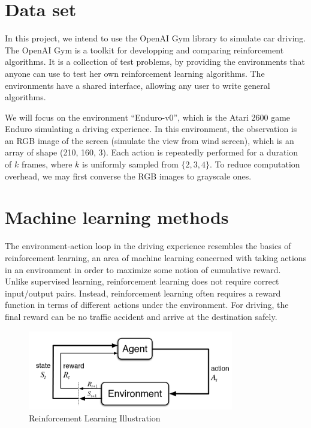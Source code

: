 \documentclass[a4paper]{article}
\begin{document}
\section{Data set}

In this project, we intend to use the OpenAI Gym library to simulate car driving.
The OpenAI Gym is a toolkit for developping and comparing reinforcement algorithms.
It is a collection of test problems, by providing the environments that anyone can
use to test her own reinforcement learning algorithms. The environments have a shared
interface, allowing any user to write general algorithms.

We will focus on the environment ``Enduro-v0'', which is the Atari 2600 game Enduro
simulating a driving experience. In this environment, the observation is an RGB image
of the screen (simulate the view from wind screen), which is an array of shape (210,
160, 3). Each action is repeatedly performed for a duration of $k$ frames, where $k$
is uniformly sampled from $\{2, 3, 4\}$. To reduce computation overhead, we may first
converse the RGB images to grayscale ones.

\section{Machine learning methods}

The environment-action loop in the driving experience resembles the basics of reinforcement
learning, an area of machine learning concerned with taking actions in an environment in
order to maximize some notion of cumulative reward. Unlike supervised learning, reinforcement
learning does not require correct input/output pairs. Instead, reinforcement learning often
requires a reward function in terms of different actions under the environment. For driving,
the final reward can be no traffic accident and arrive at the destination safely.

\begin{figure}
    \centering
    \includegraphics[width=0.8\textwidth]{./figures/rl.png}
    \caption{ Reinforcement Learning Illustration}
    \label{fig:RL}
\end{figure}
\end{document}
